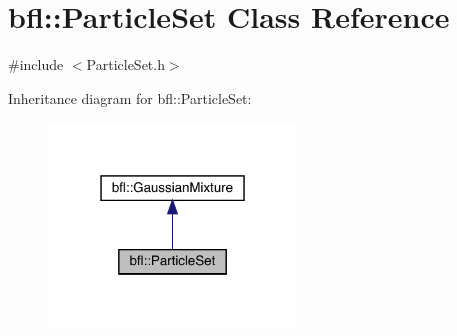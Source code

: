 \hypertarget{classbfl_1_1ParticleSet}{}\section{bfl\+:\+:Particle\+Set Class Reference}
\label{classbfl_1_1ParticleSet}


{\ttfamily \#include $<$Particle\+Set.\+h$>$}



Inheritance diagram for bfl\+:\+:Particle\+Set\+:
\nopagebreak
\begin{figure}[H]
\begin{center}
\leavevmode
\includegraphics[width=187pt]{classbfl_1_1ParticleSet__inherit__graph}
\end{center}
\end{figure}
